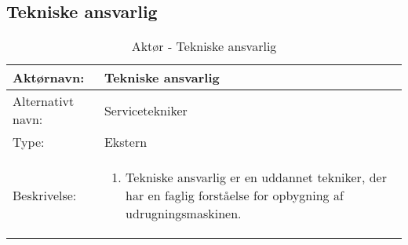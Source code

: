 
\subsection{Tekniske ansvarlig}

\begin{table}[H]
\centering
\begin{tabular}[\textwidth]{|p{}|p{}|}
\hline Aktørnavn: & Tekniske ansvarlig \\ 
\hline Alternativt navn: & Servicetekniker \\ 
\hline Type: & Ekstern \\ 
\hline Beskrivelse: & 
		\begin{enumerate}
		\item Tekniske ansvarlig er en uddannet tekniker, der har en faglig forståelse for opbygning af udrugningsmaskinen.
		\end{enumerate} \\ 
\hline
\end{tabular}
\caption{Aktør - Tekniske ansvarlig}
\label{tab:usecase-aktoer-tekniskeansvarlig}
\end{table}

